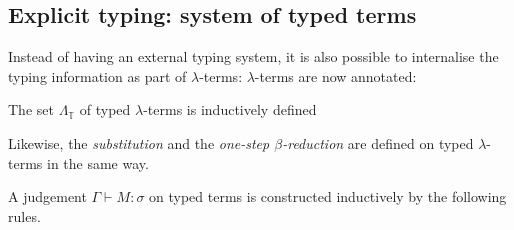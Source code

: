 \subsection{Explicit typing: system of typed terms}
Instead of having an external typing system, it is also possible to internalise
the typing information as part of $\lambda$-terms:
$\lambda$-terms are now
annotated:
\begin{definition}
  The set $\Lambda_\mathbb{T}$ of typed $\lambda$-terms is inductively defined
  \begin{multicols}{2}
    \begin{prooftree}
    \end{prooftree}
    \begin{prooftree}
    \end{prooftree}
    \begin{prooftree}
    \end{prooftree}
  \end{multicols}
\end{definition}
Likewise, the \emph{substitution} and the \emph{one-step $\beta$-reduction} are
defined on typed $\lambda$-terms in the same way.
\begin{definition}
  A judgement $\Gamma \vdash M : \sigma$ on typed terms is constructed
  inductively by the following rules.
  \begin{multicols}{2} 
  \begin{prooftree}
  \end{prooftree}
  \begin{prooftree}
  \end{prooftree}
  \begin{prooftree}
  \end{prooftree}
  \end{multicols}
\end{definition}


